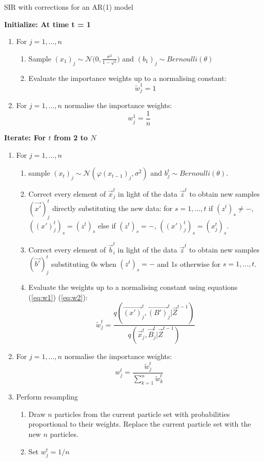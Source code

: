 \begin{algorithm}[H]
\caption{SIR with corrections for an AR(1) model}\label{SIR_AR1}
 \begin{algorithmic}

 \State  \bf{Initialize:} \normalfont At time t = 1
            
\begin{enumerate}
	\item For $j = 1, \dots , n$
	\begin{enumerate}
		\item Sample $(x_{1})_j \sim \mathcal{N} \Bigg (0, \frac{\sigma^2}{1- \varphi^2} \Bigg)$ and $(b_1)_j \sim Bernoulli(\theta)$
		\item Evaluate the importance weights up to a normalising constant:
		\[
		\tilde{w}^{1}_{j} = 1
		\]
	\end{enumerate}
	\item For $j = 1, \dots , n$ normalise the importance weights: 
	\[
	w^{1}_{j} = \frac{1}{n}
	\]
\end{enumerate}

 \State  \bf{Iterate:} \normalfont For $t$ from 2 to $N$

\begin{enumerate}
	\item For $j = 1, \dots , n$
	\begin{enumerate}
  		\item sample $(x_t)_j \sim \mathcal{N} (\varphi (x_{t-1})_j, \sigma^{2})$ and $b^t_{j} \sim Bernoulli(\theta)$.
		\item {Correct every element of $\vec{x}^t_j$ in light of the data $\vec{z}^t$ to obtain new samples $(\vec{x'})^t_j$ directly substituting the new data: for $s = 1, \dots ,t$ if $(z^t)_s \neq -$, $((x')_j^t)_s = (z^t)_s$ else if $(z^t)_s = -$, $((x')_j^t)_s = (x^t_j)_s$.}
		\item Correct every element of $\vec{b}_i^t$ in light of the data $\vec{z}^t$ to obtain new samples $(\vec{b'})^t_j$ substituting 0s when $(z^t)_s = -$ and 1s otherwise for $s = 1, \dots, t$.
		\item Evaluate the weights up to a normalising constant using equations (\ref{eq:w1}) (\ref{eq:w2}):
		\[
		\tilde{w}^{t}_{j} = \frac{q(\vec{(x')}^{t}_j, \vec{(B')}^{t}_j | \vec{Z}^{t-1})}{q(\vec{x}^{t}_j, \vec{B}^{t}_j | \vec{Z}^{t-1})}
		\]
	\end{enumerate}
	\item For $j = 1, \dots , n$ normalise the importance weights:
	\[
	w^{t}_{j} = \frac{\tilde{w}^t_j}{\sum_{k=1}^{n}\tilde{w}^{t}_k}
	\]
	\item Perform resampling
	\begin{enumerate}
	    \item Draw $n$ particles from the current particle set with probabilities proportional to their weights. Replace the current particle set with the new $n$ particles.
	    \item Set $w^t_j=1/n$
	\end{enumerate}
\end{enumerate}
  
 \end{algorithmic}
\end{algorithm}

